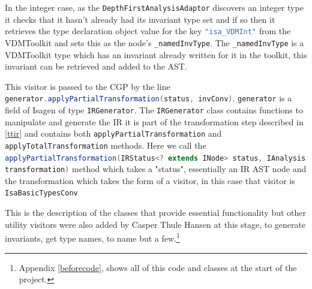 	In the integer case, as the \lstinline[language=Java]{DepthFirstAnalysisAdaptor} discovers an integer type it checks that it hasn't already had its invariant type set and if so then it retrieves the type declaration object value for the key \lstinline[language=Java]{"isa_VDMInt"} from the VDMToolkit and sets this as the node's \lstinline[language=Java]{_namedInvType}. The \lstinline[language=Java]{_namedInvType} is a VDMToolkit type which has an invariant already written for it in the toolkit, this invariant can be retrieved and added to the AST.

	This visitor is passed to the CGP by the line \lstinline[language=Java]{generator.applyPartialTransformation(status, invConv)}. \lstinline[language=Java]{generator} is a field of Isagen of type \lstinline[language=Java]{IRGenerator}. The \lstinline[language=Java]{IRGenerator} class contains functions to manipulate and generate the IR it is part of the transformation step described in \ref{ttir} and contains both \lstinline[language=Java]{applyPartialTransformation} and \lstinline[language=Java]{applyTotalTransformation} methods. Here we call the \lstinline[language=Java]{applyPartialTransformation(IRStatus<? extends INode> status, IAnalysis transformation)} method which takes a "status", essentially an IR AST node and the transformation which takes the form of a visitor, in this case that visitor is \lstinline[language=Java]{IsaBasicTypesConv}
	
	This is the description of the classes that provide essential functionality but other utility visitors were also added by Casper Thule Hansen at this stage, to generate invariants, get type names, to name but a few.\footnote{Appendix \ref{beforecode}, shows all of this code and classes at the start of the project.}

